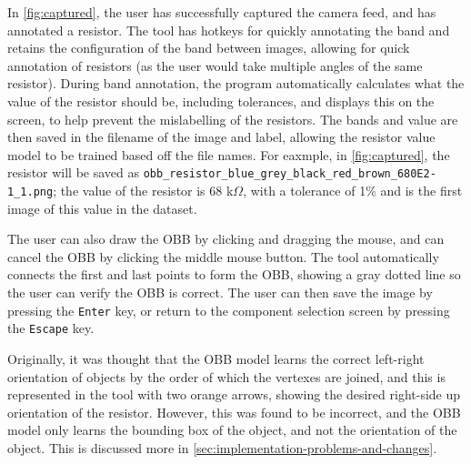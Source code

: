 In \autoref{fig:captured}, the user has successfully captured the camera feed, and has annotated a resistor. The tool has hotkeys for quickly annotating the band and retains the configuration of the band between images, allowing for quick annotation of resistors (as the user would take multiple angles of the same resistor). During band annotation, the program automatically calculates what the value of the resistor should be, including tolerances, and displays this on the screen, to help prevent the mislabelling of the resistors. The bands and value are then saved in the filename of the image and label, allowing the resistor value model to be trained based off the file names. For eaxmple, in \autoref{fig:captured}, the resistor will be saved as \texttt{obb\_resistor\_blue\_grey\_black\_red\_brown\_680E2-1\_1.png}; the value of the resistor is 68 k$\Omega$, with a tolerance of 1\% and is the first image of this value in the dataset.

The user can also draw the OBB by clicking and dragging the mouse, and can cancel the OBB by clicking the middle mouse button. The tool automatically connects the first and last points to form the OBB, showing a gray dotted line so the user can verify the OBB is correct. The user can then save the image by pressing the \texttt{Enter} key, or return to the component selection screen by pressing the \texttt{Escape} key.

Originally, it was thought that the OBB model learns the correct left-right orientation of objects by the order of which the vertexes are joined, and this is represented in the tool with two orange arrows, showing the desired right-side up orientation of the resistor. However, this was found to be incorrect, and the OBB model only learns the bounding box of the object, and not the orientation of the object. This is discussed more in \autoref{sec:implementation-problems-and-changes}.

